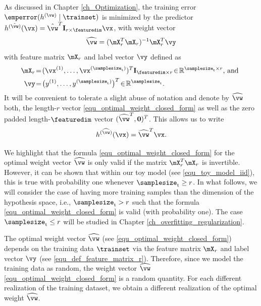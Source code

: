 \documentclass[12pt]{report}
\begin{document}
As discussed in Chapter \ref{ch_Optimization}, the training error $\emperror (h^{(\vw)} \mid \trainset)$ is minimized by the predictor 
$h^{(\hat{\vw})}(\vx) =  \hat{\vw}^{T} \mathbf{I}_{r \times \featuredim} \vx$, 
with weight vector 
\begin{equation}
\label{equ_optimal_weight_closed_form}
\widehat{\vw} =  (\mX^{T}_{r} \mX_{r})^{-1} \mX_{r}^{T} \vy
\end{equation} 
with feature matrix $\mX_{r}$ and label vector $\vy$ defined as 
\begin{align}
\label{equ_def_feature_matrix_r}
\mX_{r}& \!=\!(\vx^{(1)},\ldots,\vx^{(\samplesize_{\rm t})})^{T} \mathbf{I}_{\featuredim \times r}\!\in\!\mathbb{R}^{\samplesize_{\rm t} \times r} \mbox{, and }  \nonumber \\
\vy& \!=\!\big(y^{(1)},\ldots,y^{(\samplesize_{\rm t})}\big)^{T}\!\in\!\mathbb{R}^{\samplesize_{\rm t}}.
\end{align} 
It will be convenient to tolerate a slight abuse of notation and denote by $\widehat{\vw}$ both, the length-$r$ vector 
\eqref{equ_optimal_weight_closed_form} as well as the zero padded length-$\featuredim$ vector 
$(\widehat{\vw}^{T},\mathbf{0})^{T}$. This allows us to write %
\begin{equation} 
h^{(\widehat{\vw})}(\vx) = \widehat{\vw}^{T} \vx. 
\end{equation}

We highlight that the formula \eqref{equ_optimal_weight_closed_form} for the optimal weight vector $\widehat{\vw}$ 
is only valid if the matrix $\mX^{T}_{r} \mX_{r}$ is invertible. However, it can be shown that within our toy model 
(see \eqref{equ_toy_model_iid}), this is true with probability one whenever $\samplesize_{\rm t} \geq r$. In what 
follows, we will consider the case of having more training samples than the dimension of the hypothesis space, i.e., 
$\samplesize_{\rm t} > r$ such that the formula \eqref{equ_optimal_weight_closed_form} is valid (with probability one). 
The case $\samplesize_{\rm t} \leq r$ will be studied in Chapter \ref{ch_overfitting_regularization}.

The optimal weight vector $\widehat{\vw}$ (see \eqref{equ_optimal_weight_closed_form}) depends on the training 
data $\trainset$ via the feature matrix $\mX_{r}$ and label vector $\vy$ (see \eqref{equ_def_feature_matrix_r}). 
Therefore, since we model the training data as random, the weight vector $\widehat{\vw}$ \eqref{equ_optimal_weight_closed_form} 
is a random quantity. For each different realization of the training dataset, we obtain a different realization of the 
optimal weight $\widehat{\vw}$. 
\end{document}
